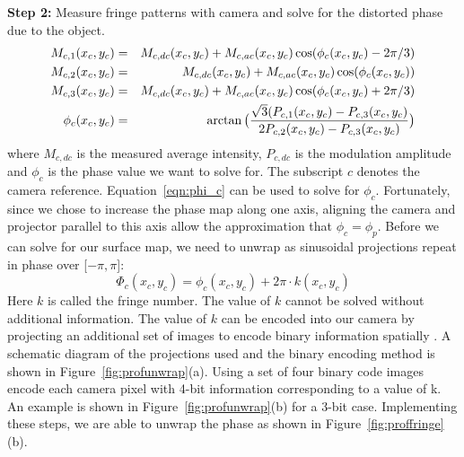 \noindent
\textbf{Step 2:} Measure fringe patterns with camera and solve for the distorted phase due to the object.
\begin{eqnarray}
\label{eqn:fringe}
M_{c,1}(x_c,y_c) & = & M_{c,dc}(x_c,y_c)+M_{c,ac}(x_c,y_c)\cos(\phi_c(x_c,y_c)-2\pi/3)\notag \\
M_{c,2}(x_c,y_c) & = & M_{c,dc}(x_c,y_c)+M_{c,ac}(x_c,y_c)\cos(\phi_c(x_c,y_c))\notag\\
M_{c,3}(x_c,y_c) & = & M_{c,dc}(x_c,y_c)+M_{c,ac}(x_c,y_c)\cos(\phi_c(x_c,y_c)+2\pi/3) \\
\phi_c(x_c,y_c)  & = &\arctan\big(\frac{\sqrt{3}(P_{c,1}(x_c,y_c)-P_{c,3}(x_c,y_c)}{2P_{c,2}(x_c,y_c)-P_{c,3}(x_c,y_c)}\big) \label{eqn:phi_c}
\end{eqnarray}
\noindent
where $M_{c,dc}$ is the measured average intensity, $P_{c,dc}$ is the modulation amplitude and $\phi_c$ is the phase value we want to solve for. The subscript $c$ denotes the camera reference. Equation~\ref{eqn:phi_c} can be used to solve for $\phi_c$. Fortunately, since we chose to increase the phase map along one axis, aligning the camera and projector parallel to this axis allow the approximation that $\phi_c=\phi_p$. Before we can solve for our surface map, we need to unwrap as sinusoidal projections repeat in phase over [$-\pi, \pi$]:
\begin{equation}
\Phi_c(x_c,y_c)= \phi_c(x_c,y_c)+2\pi\cdot k(x_c,y_c)
\end{equation}
Here $k$ is called the fringe number. The value of $k$ cannot be solved without additional information. The value of $k$ can be encoded into our camera by projecting an additional set of images to encode binary information spatially \cite{Zhang2006}. A schematic diagram of the projections used and the binary encoding method is shown in Figure~\ref{fig:profunwrap}(a). Using a set of four binary code images encode each camera pixel with 4-bit information corresponding to a value of k. An example is shown in Figure~\ref{fig:profunwrap}(b) for a 3-bit case. Implementing these steps, we are able to unwrap the phase as shown in Figure~\ref{fig:proffringe}(b).


